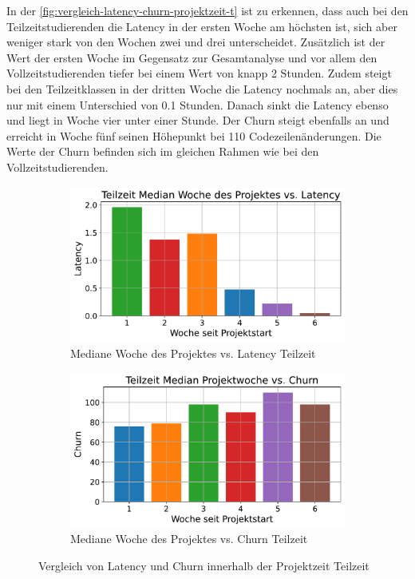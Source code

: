 In der \autoref{fig:vergleich-latency-churn-projektzeit-t} ist zu erkennen, dass auch bei den Teilzeitstudierenden die Latency in der ersten Woche am höchsten ist, sich aber weniger stark von den Wochen zwei und drei unterscheidet. Zusätzlich ist der Wert der ersten Woche im Gegensatz zur Gesamtanalyse und vor allem den Vollzeitstudierenden tiefer bei einem Wert von knapp 2 Stunden. Zudem steigt bei den Teilzeitklassen in der dritten Woche die Latency nochmals an, aber dies nur mit einem Unterschied von 0.1 Stunden. Danach sinkt die Latency ebenso und liegt in Woche vier unter einer Stunde. Der Churn steigt ebenfalls an und erreicht in Woche fünf seinen Höhepunkt bei 110 Codezeilenänderungen. Die Werte der Churn befinden sich im gleichen Rahmen wie bei den Vollzeitstudierenden.

\begin{figure}[htbp]
    \centering
    \begin{subfigure}[b]{0.48\textwidth}
        \centering
        \includegraphics[width=\textwidth]{Figures/mittelwert-woche-latency-t.pdf}
        \caption{Mediane Woche des Projektes vs. Latency Teilzeit}
        \label{fig:mittelwert-woche-lateny-t}
    \end{subfigure}
    \hfill
    \begin{subfigure}[b]{0.48\textwidth}
        \centering
        \includegraphics[width=\textwidth]{Figures/mittelwert-woche-churn-t.pdf}
        \caption{Mediane Woche des Projektes vs. Churn Teilzeit}
        \label{fig:mittelwert-woche-churn-t}
    \end{subfigure}
    \caption{Vergleich von Latency und Churn innerhalb der Projektzeit Teilzeit}
    \label{fig:vergleich-latency-churn-projektzeit-t}
\end{figure}
